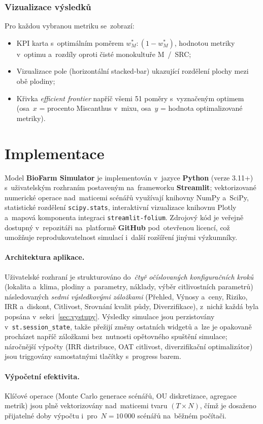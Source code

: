 \subsubsection{Vizualizace výsledků}
\label{sec:diverzifikace_viz}

Pro každou vybranou metriku se~zobrazí:
\begin{itemize}
    \item KPI karta s~optimálním poměrem $w_M^* : (1-w_M^*)$, hodnotou
          metriky v~optimu a~rozdíly oproti čisté monokultuře M~/~SRC;
    \item Vizualizace pole (horizontální stacked-bar) ukazující
          rozdělení plochy mezi obě plodiny;
    \item Křivka \emph{efficient frontier} napříč všemi 51 poměry
          s~vyznačeným optimem (osa~$x$ = procento Miscanthus v~mixu,
          osa~$y$ = hodnota optimalizované metriky).
\end{itemize}

\section{Implementace}
\label{sec:implementace}

Model \textbf{BioFarm Simulator} je implementován v~jazyce \textbf{Python}
(verze 3.11+) s~uživatelským rozhraním postaveným na~frameworku
\textbf{Streamlit}; vektorizované numerické operace nad~maticemi scénářů
využívají knihovny NumPy a~SciPy, statistické rozdělení \texttt{scipy.stats},
interaktivní vizualizace knihovnu Plotly a~mapová komponenta integraci
\texttt{streamlit-folium}. Zdrojový kód je veřejně dostupný v~repozitáři
na~platformě \textbf{GitHub} pod~otevřenou licencí, což umožňuje
reprodukovatelnost simulací i~další rozšíření jinými výzkumníky.

\paragraph{Architektura aplikace.}
Uživatelské rozhraní je strukturováno do~\emph{čtyř očíslovaných
konfiguračních kroků} (lokalita a~klima, plodiny a~parametry, náklady,
výběr citlivostních parametrů) následovaných \emph{sedmi výsledkovými
záložkami} (Přehled, Výnosy a~ceny, Riziko, IRR a~diskont, Citlivost,
Srovnání kvalit půdy, Diverzifikace), z~nichž každá byla popsána
v~sekci~\ref{sec:vystupy}. Výsledky simulace jsou perzistovány
v~\texttt{st.session\_state}, takže přežijí změny ostatních widgetů
a~lze je opakovaně procházet napříč záložkami bez~nutnosti opětovného
spuštění simulace; náročnější výpočty (IRR distribuce, OAT citlivost,
diverzifikační optimalizátor) jsou triggovány samostatnými tlačítky
s~progress barem.

\paragraph{Výpočetní efektivita.}
Klíčové operace (Monte Carlo generace scénářů, OU diskretizace,
agregace metrik) jsou plně vektorizovány nad~maticemi tvaru
$(T \times N)$, čímž je dosaženo přijatelné doby výpočtu i~pro~$N = 10\,000$
scénářů na~běžném počítači.

